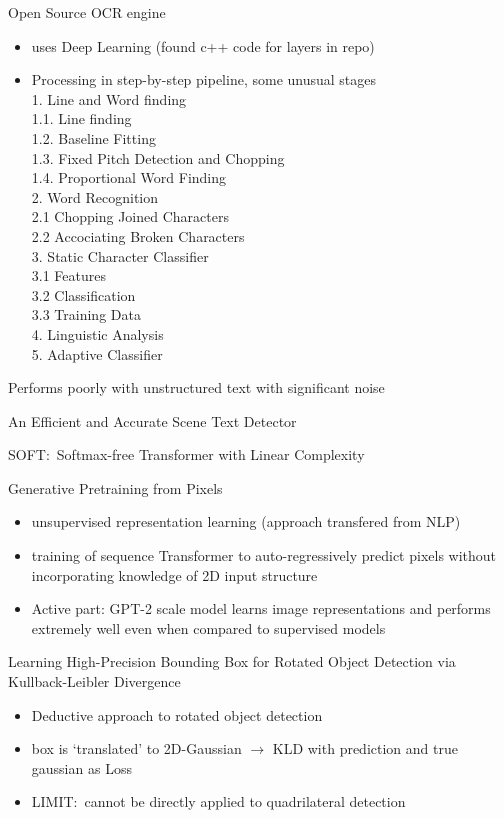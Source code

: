 Open Source OCR engine~\cite{smith_overview_2007}
\begin{itemize}
    \item uses Deep Learning (found c++ code for layers in repo)
    \item Processing in step-by-step pipeline, some unusual stages\\
        1. Line and Word finding\\
        1.1. Line finding\\
        1.2. Baseline Fitting\\
        1.3. Fixed Pitch Detection and Chopping\\
        1.4. Proportional Word Finding\\
        2. Word Recognition\\
        2.1 Chopping Joined Characters\\
        2.2 Accociating Broken Characters\\
        3. Static Character Classifier\\
        3.1 Features\\
        3.2 Classification\\
        3.3 Training Data\\
        4. Linguistic Analysis\\
        5. Adaptive Classifier
\end{itemize}
Performs poorly with unstructured text with significant noise

An Efficient and Accurate Scene Text Detector~\cite{zhou_east_2017}

SOFT:\ Softmax-free Transformer with Linear Complexity~\cite{lu_soft_2021}

Generative Pretraining from Pixels~\cite{chen_generative_2021}
\begin{itemize}
    \item unsupervised representation learning (approach transfered from NLP)
    \item training of sequence Transformer to auto-regressively predict pixels without incorporating
        knowledge of 2D input structure
    \item Active part: GPT-2 scale model learns image representations and performs extremely well even
        when compared to supervised models
\end{itemize}

Learning High-Precision Bounding Box for Rotated Object Detection via Kullback-Leibler
Divergence~\cite{yang_learning_2021}
\begin{itemize}
    \item Deductive approach to rotated object detection
    \item box is `translated' to 2D-Gaussian $\rightarrow$ KLD with prediction and true gaussian as Loss
    \item LIMIT:\ cannot be directly applied to quadrilateral detection
\end{itemize}

